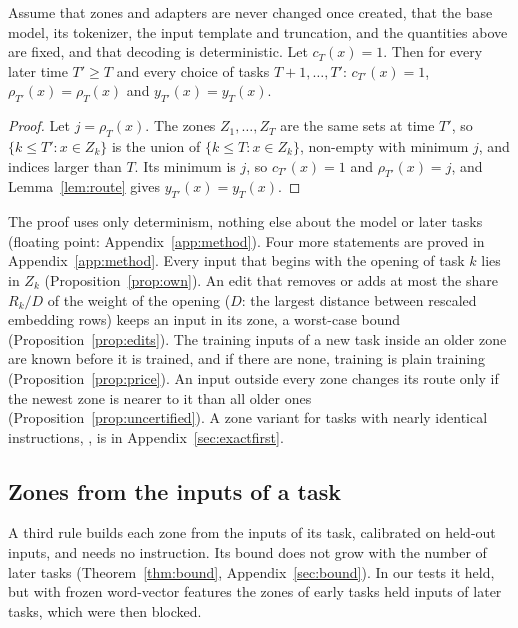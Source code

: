 \begin{theorem}
\label{thm:writeonce}
Assume that zones and adapters are never changed once created, that the base model, its tokenizer,
the input template and truncation, and the quantities above are fixed, and that decoding is
deterministic. Let $c_T(x) = 1$. Then for every later time $T' \ge T$ and every choice of tasks
$T+1, \dots, T'$: $c_{T'}(x) = 1$, $\rho_{T'}(x) = \rho_T(x)$ and $y_{T'}(x) = y_T(x)$.
\end{theorem}

\begin{proof}
Let $j = \rho_T(x)$. The zones $Z_1, \dots, Z_T$ are the same sets at time $T'$, so
$\{k \le T' : x \in Z_k\}$ is the union of $\{k \le T : x \in Z_k\}$, non-empty with minimum $j$, and
indices larger than $T$. Its minimum is $j$, so $c_{T'}(x) = 1$ and $\rho_{T'}(x) = j$, and
Lemma~\ref{lem:route} gives $y_{T'}(x) = y_T(x)$.
\end{proof}

The proof uses only determinism, nothing else about the model or later tasks (floating point:
Appendix~\ref{app:method}). Four more statements are proved in Appendix~\ref{app:method}. Every input
that begins with the opening of task $k$ lies in $Z_k$ (Proposition~\ref{prop:own}). An edit that
removes or adds at most the share $R_k/D$ of the weight of the opening ($D$: the largest distance between rescaled
embedding rows) keeps an input in its zone, a worst-case bound (Proposition~\ref{prop:edits}). The training inputs of a new task inside an older
zone are known before it is trained, and if there are none, training is plain training
(Proposition~\ref{prop:price}). An input outside every zone changes its route only if the newest zone
is nearer to it than all older ones (Proposition~\ref{prop:uncertified}). A zone variant for tasks with
nearly identical instructions, \exactfirst{}, is in Appendix~\ref{sec:exactfirst}.

\subsection{Zones from the inputs of a task}
\label{sec:boundmain}

A third rule builds each zone from the inputs of its task, calibrated on held-out inputs, and needs no
instruction. Its bound does not grow with the number of later tasks (Theorem~\ref{thm:bound},
Appendix~\ref{sec:bound}). In our tests it held, but with frozen word-vector features the zones of
early tasks held inputs of later tasks, which were then blocked.
